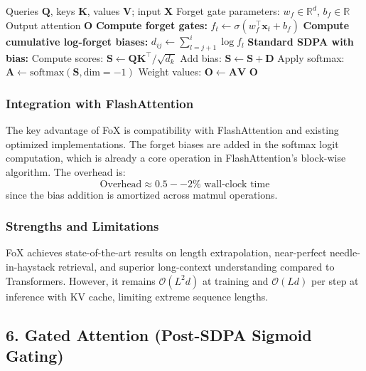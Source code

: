 \begin{algorithm}[H]
\caption{FoX: Forgetting Attention with Recency Bias}
\begin{algorithmic}[1]
\Require Queries $\mathbf{Q}$, keys $\mathbf{K}$, values $\mathbf{V}$; input $\mathbf{X}$
\Require Forget gate parameters: $w_f \in \mathbb{R}^d$, $b_f \in \mathbb{R}$
\Ensure Output attention $\mathbf{O}$
\State \textbf{Compute forget gates:}
    \State $f_t \gets \sigma(w_f^\top \mathbf{x}_t + b_f)$ 
\EndFor
\State \textbf{Compute cumulative log-forget biases:}
        \State $d_{ij} \gets \sum_{l=j+1}^{i} \log f_l$ 
    \EndFor
\EndFor
\State \textbf{Standard SDPA with bias:}
\State Compute scores: $\mathbf{S} \gets \mathbf{Q}\mathbf{K}^\top / \sqrt{d_k}$
\State Add bias: $\mathbf{S} \gets \mathbf{S} + \mathbf{D}$
\State Apply softmax: $\mathbf{A} \gets \text{softmax}(\mathbf{S}, \text{dim}=-1)$
\State Weight values: $\mathbf{O} \gets \mathbf{A} \mathbf{V}$
\Return $\mathbf{O}$
\end{algorithmic}
\end{algorithm}

\subsubsection{Integration with FlashAttention}

The key advantage of FoX is compatibility with FlashAttention and existing optimized implementations. The forget biases are added in the softmax logit computation, which is already a core operation in FlashAttention's block-wise algorithm. The overhead is:
\[
\text{Overhead} \approx 0.5--2\% \text{ wall-clock time}
\]
since the bias addition is amortized across matmul operations.

\subsubsection{Strengths and Limitations}

FoX achieves state-of-the-art results on length extrapolation, near-perfect needle-in-haystack retrieval, and superior long-context understanding compared to Transformers. However, it remains $\mathcal{O}(L^2 d)$ at training and $\mathcal{O}(L d)$ per step at inference with KV cache, limiting extreme sequence lengths.

\subsection{6. Gated Attention (Post-SDPA Sigmoid Gating)}

